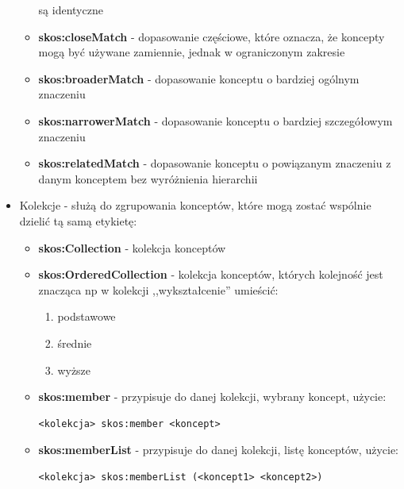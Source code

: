 \begin{itemize}
\begin{itemize}
          są identyczne
        \item \textbf{skos:closeMatch} - dopasowanie częściowe, które oznacza,
          że koncepty mogą być używane zamiennie, jednak w ograniczonym
          zakresie
        \item \textbf{skos:broaderMatch} - dopasowanie konceptu o bardziej
          ogólnym znaczeniu
        \item \textbf{skos:narrowerMatch} - dopasowanie konceptu o bardziej
          szczegółowym znaczeniu
        \item \textbf{skos:relatedMatch} - dopasowanie konceptu o powiązanym
          znaczeniu z danym konceptem bez wyróżnienia hierarchii
      \end{itemize}
    \item Kolekcje - służą do zgrupowania konceptów, które mogą zostać wspólnie
      dzielić tą samą etykietę:
      \begin{itemize}
        \item \textbf{skos:Collection} - kolekcja konceptów
        \item \textbf{skos:OrderedCollection} - kolekcja konceptów, których
          kolejność jest znacząca np w kolekcji ,,wykształcenie'' umieścić:
          \begin{enumerate}
            \item podstawowe
            \item średnie
            \item wyższe
          \end{enumerate}
        \item \textbf{skos:member} - przypisuje do danej kolekcji, wybrany
          koncept, użycie:
\begin{verbatim}
<kolekcja> skos:member <koncept>
\end{verbatim}
        \item \textbf{skos:memberList} - przypisuje do danej kolekcji, listę
          konceptów, użycie:
\begin{verbatim}
<kolekcja> skos:memberList (<koncept1> <koncept2>)
\end{verbatim}
      \end{itemize}
\end{itemize}





